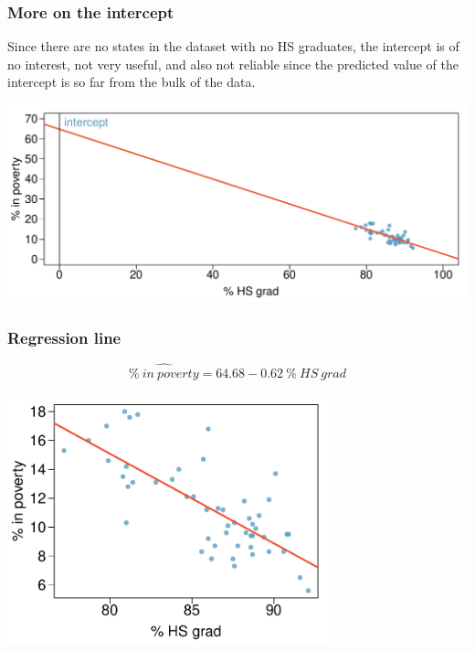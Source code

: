 
\begin{frame}
\frametitle{More on the intercept}

Since there are no states in the dataset with no HS graduates, the intercept is of no interest, not very useful, and also not reliable since the predicted value of the intercept is so far from the bulk of the data.

\begin{center}
\includegraphics[width=\textwidth]{8-2_least_square_reg/figures/poverty/poverty_hsgrad_line_wide}
\end{center}

\end{frame}


\begin{frame}
\frametitle{Regression line}

\[ \widehat{\%~in~poverty} = 64.68 - 0.62~\%~HS~grad \]

\begin{center}
\includegraphics[width=0.7\textwidth]{8-2_least_square_reg/figures/poverty/poverty_hsgrad_line}
\end{center}

\end{frame}

